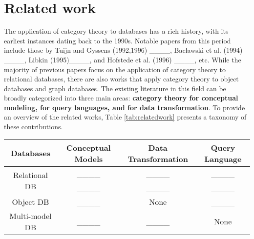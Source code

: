 \section{Related work}
\label{sec:relatedwork}










The application of category theory to databases has a rich history, with its earliest instances dating back to the 1990s. Notable papers from this period include those by Tuijn and Gyssens (1992,1996) ____, Baclawski et al. (1994) ____, Libkin (1995)____,  and Hofstede et al. (1996) ____, etc. While the majority of previous papers focus on the application of category theory to relational databases, there are also works that apply category theory to object databases and graph databases. The existing literature in this field can be broadly categorized into three main areas: \textbf{category theory for conceptual modeling,  for query languages, and for data transformation}. To provide an overview of the related works, Table \ref{tab:relatedwork} presents a taxonomy of these contributions.



\begin{table*}
\caption{Applying category theory on databases}
\label{tab:relatedwork}
\begin{tabular}{ cccc } 
  \toprule
Databases & Conceptual Models & Data Transformation & Query Language  \\ [0.5ex] 
  \midrule
 \multirow{2}{*}{Relational DB} & ____ & ____ & ____ \\
  & ____ & ____ & ____ \\
  
 Object DB & ____  & None & ____  \\ 
 
 Multi-model DB & ____  & ____ &   None  \\ 
 \bottomrule 
\end{tabular}
\end{table*}


